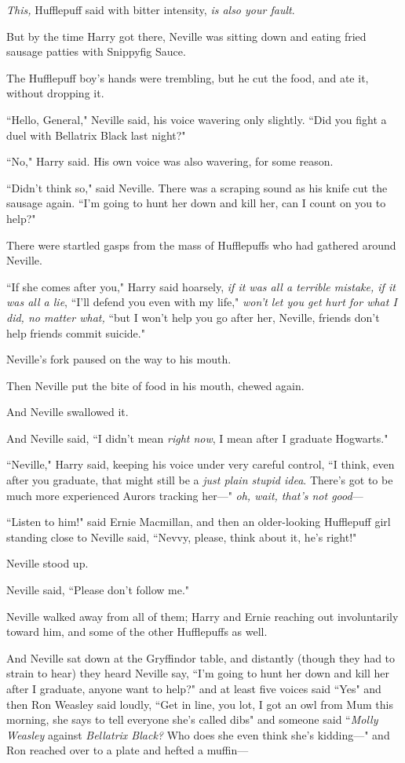 \emph{This,} Hufflepuff said with bitter intensity, \emph{is also your fault}.

But by the time Harry got there, Neville was sitting down and eating fried sausage patties with Snippyfig Sauce.

The Hufflepuff boy's hands were trembling, but he cut the food, and ate it, without dropping it.

``Hello, General," Neville said, his voice wavering only slightly. ``Did you fight a duel with Bellatrix Black last night?"

``No," Harry said. His own voice was also wavering, for some reason.

``Didn't think so," said Neville. There was a scraping sound as his knife cut the sausage again. ``I'm going to hunt her down and kill her, can I count on you to help?"

There were startled gasps from the mass of Hufflepuffs who had gathered around Neville.

``If she comes after you," Harry said hoarsely, \emph{if it was all a terrible mistake, if it was all a lie}, ``I'll defend you even with my life," \emph{won't let you get hurt for what I did, no matter what,} ``but I won't help you go after her, Neville, friends don't help friends commit suicide."

Neville's fork paused on the way to his mouth.

Then Neville put the bite of food in his mouth, chewed again.

And Neville swallowed it.

And Neville said, ``I didn't mean \emph{right now}, I mean after I graduate Hogwarts."

``Neville," Harry said, keeping his voice under very careful control, ``I think, even after you graduate, that might still be a \emph{just plain stupid idea}. There's got to be much more experienced Aurors tracking her---" \emph{oh, wait, that's not good}---

``Listen to him!" said Ernie Macmillan, and then an older-looking Hufflepuff girl standing close to Neville said, ``Nevvy, please, think about it, he's right!"

Neville stood up.

Neville said, ``Please don't follow me."

Neville walked away from all of them; Harry and Ernie reaching out involuntarily toward him, and some of the other Hufflepuffs as well.

And Neville sat down at the Gryffindor table, and distantly (though they had to strain to hear) they heard Neville say, ``I'm going to hunt her down and kill her after I graduate, anyone want to help?" and at least five voices said ``Yes" and then Ron Weasley said loudly, ``Get in line, you lot, I got an owl from Mum this morning, she says to tell everyone she's called dibs" and someone said ``\emph{Molly Weasley} against \emph{Bellatrix Black?} Who does she even think she's kidding---" and Ron reached over to a plate and hefted a muffin---

